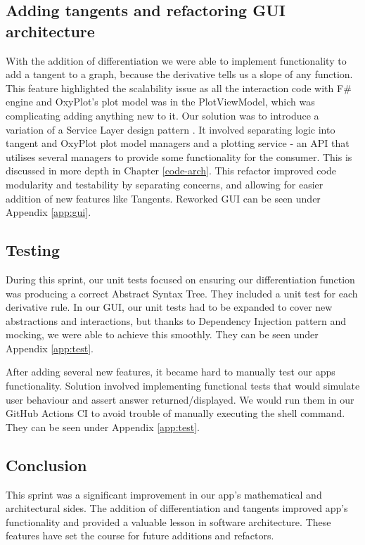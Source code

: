 \documentclass[a4paper, oneside, 11pt]{report}
\begin{document}
\subsection{Adding tangents and refactoring GUI architecture}
With the addition of differentiation we were able to implement functionality to add a tangent to a graph, because the derivative tells us a slope of any function. This feature highlighted the scalability issue as all the interaction code with F\# engine and OxyPlot's plot model was in the PlotViewModel, which was complicating adding anything new to it. Our solution was to introduce a variation of a Service Layer design pattern \cite{ServiceLayer:Wiki}. It involved separating logic into tangent and OxyPlot plot model managers and a plotting service - an API that utilises several managers to provide some functionality for the consumer. This is discussed in more depth in Chapter \ref{code-arch}. This refactor improved code modularity and testability by separating concerns, and allowing for easier addition of new features like Tangents. Reworked GUI can be seen under Appendix \ref{app:gui}.

\subsection{Testing}
During this sprint, our unit tests focused on ensuring our differentiation function was producing a correct Abstract Syntax Tree. They included a unit test for each derivative rule. In our GUI, our unit tests had to be expanded to cover new abstractions and interactions, but thanks to Dependency Injection pattern and mocking, we were able to achieve this smoothly. They can be seen under Appendix \ref{app:test}. 

After adding several new features, it became hard to manually test our apps functionality. Solution involved implementing functional tests that would simulate user behaviour and assert answer returned/displayed. We would run them in our GitHub Actions CI to avoid trouble of manually executing the shell command. They can be seen under Appendix \ref{app:test}.

\subsection{Conclusion}
This sprint was a significant improvement in our app's mathematical and architectural sides. The addition of differentiation and tangents improved app's functionality and provided a valuable lesson in software architecture. These features have set the course for future additions and refactors.
\end{document}
